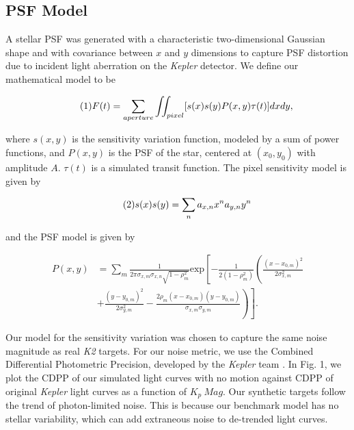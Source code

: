 \documentclass[12pt,preprint]{aastex}
\begin{document}
\subsection{PSF Model}

A stellar PSF was generated with a characteristic two-dimensional Gaussian shape and with covariance between $x$ and $y$ dimensions to capture PSF distortion due to incident light aberration on the \textit{Kepler} detector. We define our mathematical model to be

\[
\tag{1}
F(t)=\sum_{aperture} \iint_{pixel} [s(x)s(y)P(x,y)\tau (t)]dxdy,\\
\]

where $s(x,y)$ is the sensitivity variation function, modeled by a sum of power functions, and $P(x,y)$ is the PSF of the star, centered at $(x_0,y_0)$ with amplitude $A$. $\tau (t)$ is a simulated transit function. The pixel sensitivity model is given by

\[
\tag{2}
s(x)s(y) = \sum_n a_{x,n}x^na_{y,n}y^n \\
\]

and the PSF model is given by

\[
\tag{3}
\begin{split}
P(x,y) & = \sum_m \frac{1}{2\pi\sigma_{x,m}\sigma_{x,n}\sqrt{1-\rho_m^2}} \text{exp}\left[ -\frac{1}{2(1-\rho_m^2)} \left( \frac{(x-x_{0,m})^2}{2\sigma_{x,m}^2} \right. \right. \\
			 & \left. \left. + \frac{(y-y_{0,m})^2}{2\sigma_{y,m}^2} - \frac{2\rho_m  (x-x_{0,m})(y-y_{0,m})}{\sigma_{x,m}\sigma_{y,m}} \right) \right].
\end{split}
\]

Our model for the sensitivity variation was chosen to capture the same noise magnitude as real \textit{K2} targets. For our noise metric, we use the Combined Differential Photometric Precision, developed by the \textit{Kepler} team \citep{2012PASP..124.1279C}. In Fig. 1, we plot the CDPP of our simulated light curves with no motion against CDPP of original \textit{Kepler} light curves as a function of $K_p\ Mag$. Our synthetic targets follow the trend of photon-limited noise. This is because our benchmark model has no stellar variability, which can add extraneous noise to de-trended light curves.
\end{document}
